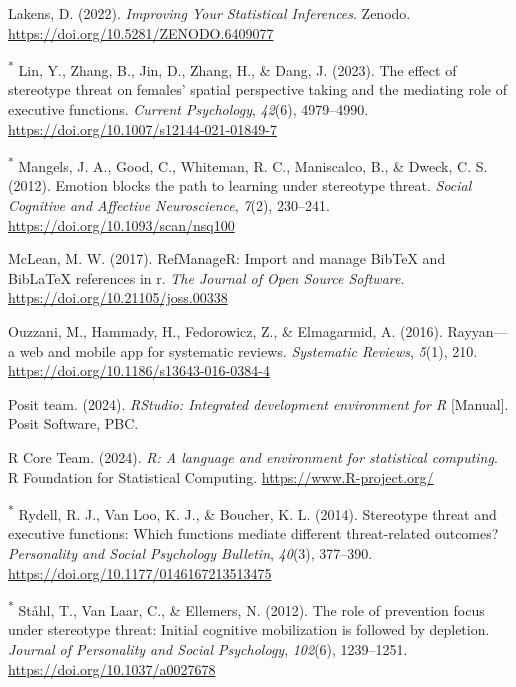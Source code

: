 \documentclass[
  stu,floatsintext]{apa7}
\newlength{\cslhangindent}
\newenvironment{CSLReferences}[2] %
 {\begin{list}{}{%
  \setlength{\itemindent}{0pt}
  \setlength{\leftmargin}{0pt}
  \setlength{\parsep}{0pt}
  \ifodd #1
   \setlength{\leftmargin}{\cslhangindent}
   \setlength{\itemindent}{-1\cslhangindent}
  \fi
  \setlength{\itemsep}{#2\baselineskip}}}
 {\end{list}}
\begin{document}
\begin{CSLReferences}{1}{0}
Lakens, D. (2022). \emph{Improving {Your Statistical Inferences}}. Zenodo. \url{https://doi.org/10.5281/ZENODO.6409077}

\textsuperscript{*} Lin, Y., Zhang, B., Jin, D., Zhang, H., \& Dang, J. (2023). The effect of stereotype threat on females' spatial perspective taking and the mediating role of executive functions. \emph{Current Psychology}, \emph{42}(6), 4979--4990. \url{https://doi.org/10.1007/s12144-021-01849-7}

\textsuperscript{*} Mangels, J. A., Good, C., Whiteman, R. C., Maniscalco, B., \& Dweck, C. S. (2012). Emotion blocks the path to learning under stereotype threat. \emph{Social Cognitive and Affective Neuroscience}, \emph{7}(2), 230--241. \url{https://doi.org/10.1093/scan/nsq100}

McLean, M. W. (2017). RefManageR: Import and manage BibTeX and BibLaTeX references in r. \emph{The Journal of Open Source Software}. \url{https://doi.org/10.21105/joss.00338}

Ouzzani, M., Hammady, H., Fedorowicz, Z., \& Elmagarmid, A. (2016). Rayyan---a web and mobile app for systematic reviews. \emph{Systematic Reviews}, \emph{5}(1), 210. \url{https://doi.org/10.1186/s13643-016-0384-4}

Posit team. (2024). \emph{{RStudio}: {Integrated} development environment for {R}} {[}Manual{]}. Posit Software, PBC.

R Core Team. (2024). \emph{R: A language and environment for statistical computing}. R Foundation for Statistical Computing. \url{https://www.R-project.org/}

\textsuperscript{*} Rydell, R. J., Van Loo, K. J., \& Boucher, K. L. (2014). Stereotype threat and executive functions: {Which} functions mediate different threat-related outcomes? \emph{Personality and Social Psychology Bulletin}, \emph{40}(3), 377--390. \url{https://doi.org/10.1177/0146167213513475}

\textsuperscript{*} Ståhl, T., Van Laar, C., \& Ellemers, N. (2012). The role of prevention focus under stereotype threat: {Initial} cognitive mobilization is followed by depletion. \emph{Journal of Personality and Social Psychology}, \emph{102}(6), 1239--1251. \url{https://doi.org/10.1037/a0027678}


\end{CSLReferences}
\end{document}
